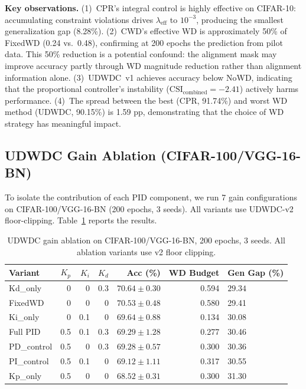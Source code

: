 \documentclass{article}
\begin{document}
\textbf{Key observations.} (1)~CPR's integral control is highly effective on CIFAR-10: accumulating constraint violations drives $\lambda_{\text{eff}}$ to $10^{-3}$, producing the smallest generalization gap (8.28\%). (2)~CWD's effective WD is approximately 50\% of FixedWD (0.24 vs.\ 0.48), confirming at 200 epochs the prediction from pilot data. This 50\% reduction is a potential confound: the alignment mask may improve accuracy partly through WD magnitude reduction rather than alignment information alone. (3)~UDWDC~v1 achieves accuracy below NoWD, indicating that the proportional controller's instability ($\text{CSI}_{\text{combined}} = -2.41$) actively harms performance. (4)~The spread between the best (CPR, 91.74\%) and worst WD method (UDWDC, 90.15\%) is 1.59 pp, demonstrating that the choice of WD strategy has meaningful impact.

\subsection{UDWDC Gain Ablation (CIFAR-100/VGG-16-BN)}

To isolate the contribution of each PID component, we run 7 gain configurations on CIFAR-100/VGG-16-BN (200 epochs, 3 seeds). All variants use UDWDC-v2 floor-clipping. Table~\ref{tab:ablation} reports the results.

\begin{table}[t]
\caption{UDWDC gain ablation on CIFAR-100/VGG-16-BN, 200 epochs, 3 seeds. All ablation variants use v2 floor clipping.}
\label{tab:ablation}
\centering
\begin{tabular}{lrrrrrl}
\toprule
Variant & $K_p$ & $K_i$ & $K_d$ & Acc (\%) & WD Budget & Gen Gap (\%) \\
\midrule
Kd\_only & 0 & 0 & 0.3 & $\mathbf{70.64 \pm 0.30}$ & 0.594 & $\mathbf{29.34}$ \\
FixedWD & 0 & 0 & 0 & $70.53 \pm 0.48$ & 0.580 & 29.41 \\
Ki\_only & 0 & 0.1 & 0 & $69.64 \pm 0.88$ & 0.134 & 30.08 \\
Full PID & 0.5 & 0.1 & 0.3 & $69.29 \pm 1.28$ & 0.277 & 30.46 \\
PD\_control & 0.5 & 0 & 0.3 & $69.28 \pm 0.57$ & 0.300 & 30.36 \\
PI\_control & 0.5 & 0.1 & 0 & $69.12 \pm 1.11$ & 0.317 & 30.55 \\
Kp\_only & 0.5 & 0 & 0 & $68.52 \pm 0.31$ & 0.300 & 31.30 \\
\bottomrule
\end{tabular}
\end{table}
\end{document}
